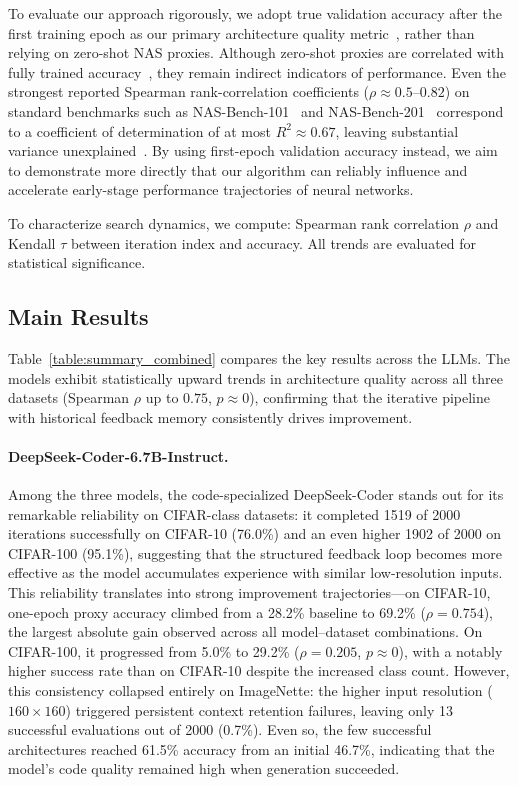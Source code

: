 \documentclass[10pt,twocolumn,letterpaper]{article}
\begin{document}
	To evaluate our approach rigorously, we adopt true validation accuracy after the first training epoch as our primary architecture quality metric~\cite{egele2024unreasonable}, rather than relying on zero-shot NAS proxies. Although zero-shot proxies are correlated with fully trained accuracy~\cite{mellor2021neural, chen2021tenas, lin2021zen}, they remain indirect indicators of performance. Even the strongest reported Spearman rank-correlation coefficients ($\rho \approx 0.5$--$0.82$) on standard benchmarks such as NAS-Bench-101~\cite{ying2019nas} and NAS-Bench-201~\cite{dong2020nas} correspond to a coefficient of determination of at most $R^2 \approx 0.67$, leaving substantial variance unexplained~\cite{abdelfattah2021zerocost, white2023neural, yu2020evaluating, yin2022bmnas}. By using first-epoch validation accuracy instead, we aim to demonstrate more directly that our algorithm can reliably influence and accelerate early-stage performance trajectories of neural networks. 
	
	To characterize search dynamics, we compute: Spearman rank correlation $\rho$ and Kendall $\tau$ between iteration index and accuracy. All trends are evaluated for statistical significance.
	
	
	\subsection{Main Results}
	
	Table~\ref{table:summary_combined} compares the key results across the LLMs. The models exhibit statistically upward trends in architecture quality across all three datasets (Spearman $\rho$ up to $0.75$, $p \approx 0$), confirming that the iterative pipeline with historical feedback memory consistently drives improvement.
	
	\paragraph{DeepSeek-Coder-6.7B-Instruct.} Among the three models, the code-specialized DeepSeek-Coder stands out for its remarkable reliability on CIFAR-class datasets: it completed 1519 of 2000 iterations successfully on CIFAR-10 (76.0\%) and an even higher 1902 of 2000 on CIFAR-100 (95.1\%), suggesting that the structured feedback loop becomes more effective as the model accumulates experience with similar low-resolution inputs. This reliability translates into strong improvement trajectories---on CIFAR-10, one-epoch proxy accuracy climbed from a 28.2\% baseline to 69.2\% ($\rho = 0.754$), the largest absolute gain observed across all model--dataset combinations. On CIFAR-100, it progressed from 5.0\% to 29.2\% ($\rho = 0.205$, $p \approx 0$), with a notably higher success rate than on CIFAR-10 despite the increased class count. However, this consistency collapsed entirely on ImageNette: the higher input resolution ($160{\times}160$) triggered persistent context retention failures, leaving only 13 successful evaluations out of 2000 (0.7\%). Even so, the few successful architectures reached 61.5\% accuracy from an initial 46.7\%, indicating that the model's code quality remained high when generation succeeded.
\end{document}

